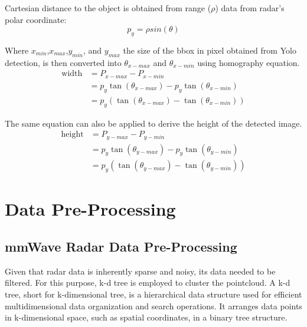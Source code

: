 Cartesian distance to the object is obtained from range ($\rho$) data from radar's polar coordinate:
\begin{equation}\label{equ:2_py_rho}
    p_y=\rho {sin(\theta)}
\end{equation}

Where $x_{min}$,$x_{max}$,$y_{min}$, and $y_{max}$ the size of the bbox in pixel obtained from Yolo detection,
is then converted  into $\theta_{x-max}$ and $\theta_{x-min}$ using homography equation.
\begin{equation}\label{equ:2_cam_width}
    \begin{split}
    \text{width}&=P_{x-max}-P_{x-min}\\
                &=p_y \tan(\theta_{x-max}) - p_y \tan(\theta_{x-min})\\
                &=p_y (\tan(\theta_{x-max}) - \tan(\theta_{x-min}))
    \end{split}
\end{equation}

The same equation can also be applied to derive the height of the detected image. 
\begin{equation}\label{equ:2_cam_height}
    \begin{split}
    \text{height}&=P_{y-max}-P_{y-min}\\
                &=p_y \tan(\theta_{y-max}) - p_y \tan(\theta_{y-min})\\
                &=p_y (\tan(\theta_{y-max}) - \tan(\theta_{y-min}))
    \end{split}
\end{equation}






\section{Data Pre-Processing}\label{sec:2-preprocessing}
\subsection{mmWave Radar Data Pre-Processing}\label{sec:2-kd_tree}
Given that radar data is inherently sparse and noisy, its data needed to be filtered.
For this purpose, k-d tree is employed to cluster the pointcloud.
A k-d tree, short for k-dimensional tree, is a hierarchical data structure used for efficient multidimensional data organization and search operations. 
It arranges data points in k-dimensional space, such as spatial coordinates, in a binary tree structure. 

